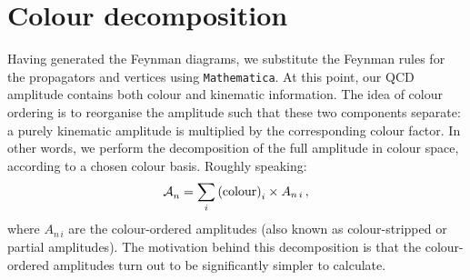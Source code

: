 \documentclass[main.tex]{subfiles}
\begin{document}
\section{Colour decomposition}
Having generated the Feynman diagrams, we substitute the Feynman rules for the propagators and vertices using \texttt{Mathematica}. At this point, our QCD amplitude contains both colour and kinematic information. The idea of colour ordering is to reorganise the amplitude such that these two components separate: a purely kinematic amplitude is multiplied by the corresponding colour factor. In other words, we perform the decomposition of the full amplitude in colour space, according to a chosen colour basis. Roughly speaking:
\begin{equation}
    \mathcal{A}_{n}^{} = \sum_i \text{(colour)}_i \times A_{n\,i} \,, 
\end{equation}
where $A_{n\,i}$ are the colour-ordered amplitudes (also known as colour-stripped or partial amplitudes). The motivation behind this decomposition is that the colour-ordered amplitudes turn out to be significantly simpler to calculate.
\end{document}
